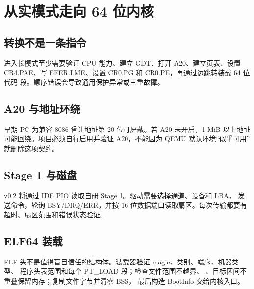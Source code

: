 \chapter{从实模式走向 64 位内核}

\section{转换不是一条指令}

进入长模式至少需要验证 CPU 能力、建立 GDT、打开 A20、建立页表、设置
CR4.PAE、写 EFER.LME、设置 CR0.PG 和 CR0.PE，再通过远跳转装载 64 位代码
段。顺序错误会导致通用保护异常或三重故障。

\begin{center}
\end{center}

\section{A20 与地址环绕}

早期 PC 为兼容 8086 曾让地址第 20 位可屏蔽。若 A20 未开启，1 MiB 以上地址
可能回绕。项目必须自行启用并验证 A20，不能因为 QEMU 默认环境“似乎可用”
就删除这项契约。

\section{Stage 1 与磁盘}

v0.2 将通过 IDE PIO 读取自研 Stage 1。驱动需要选择通道、设备和 LBA，
发送命令，轮询 BSY/DRQ/ERR，并按 16 位数据端口读取扇区。每次传输都要有
超时、扇区范围和错误状态验证。

\section{ELF64 装载}

ELF 头不是值得盲目信任的结构体。装载器验证 magic、类别、端序、机器类型、
程序头表范围和每个 PT\_LOAD 段；检查文件范围不越界、
、目标区间不重叠保留内存；复制文件字节并清零 BSS，
最后构造 BootInfo 交给内核入口。

